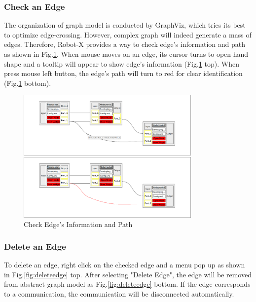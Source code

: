 \documentclass[a4paper,10pt]{book}
\begin{document}
\subsubsection{Check an Edge}

The organization of graph model is conducted by GraphViz, which tries its best to optimize edge-crossing. However, complex graph will indeed generate a mass of edges. Therefore, Robot-X provides a way to check edge's information and path as shown in Fig.\ref{fig:checkedge}. When mouse moves on an edge, its cursor turns to open-hand shape and a tooltip will appear to show edge's information (Fig.\ref{fig:checkedge} top). When press mouse left button, the edge's path will turn to red for clear identification (Fig.\ref{fig:checkedge} bottom).

\begin{figure}
 \centering
 \includegraphics[width=0.8\textwidth]{img/checkedge.eps}
 \caption{Check Edge's Information and Path}
 \label{fig:checkedge}
\end{figure}

\subsubsection{Delete an Edge}

To delete an edge, right click on the checked edge and a menu pop up as shown in Fig.\ref{fig:deleteedge} top. After selecting "Delete Edge", the edge will be removed from abstract graph model as Fig.\ref{fig:deleteedge} bottom. If the edge corresponds to a communication, the communication will be disconnected automatically.
\end{document}
